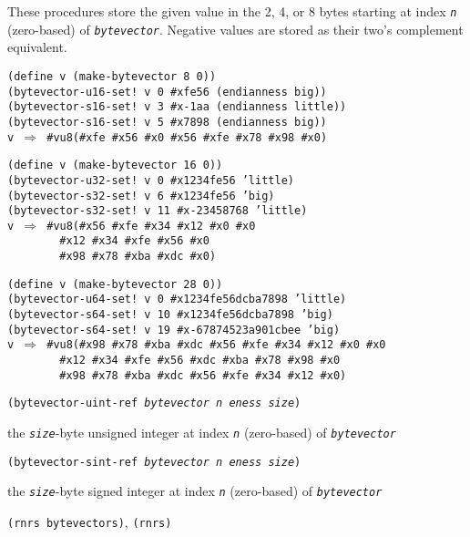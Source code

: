 These procedures store the given value in the 2, 4, or 8 bytes starting
at index \texttt{\textit{n}} (zero-based) of \texttt{\textit{bytevector}}.
Negative values are stored as their two's complement equivalent.


\begin{alltt}
(define v (make-bytevector 8 0))
(bytevector-u16-set! v 0 \#{}xfe56 (endianness big))
(bytevector-s16-set! v 3 \#{}x-1aa (endianness little))
(bytevector-s16-set! v 5 \#{}x7898 (endianness big))
v \(\Rightarrow\) \#{}vu8(\#{}xfe \#{}x56 \#{}x0 \#{}x56 \#{}xfe \#{}x78 \#{}x98 \#{}x0)

(define v (make-bytevector 16 0))
(bytevector-u32-set! v 0 \#{}x1234fe56 'little)
(bytevector-s32-set! v 6 \#{}x1234fe56 'big)
(bytevector-s32-set! v 11 \#{}x-23458768 'little)
v \(\Rightarrow\) \#{}vu8(\#{}x56 \#{}xfe \#{}x34 \#{}x12 \#{}x0 \#{}x0
        \#{}x12 \#{}x34 \#{}xfe \#{}x56 \#{}x0
        \#{}x98 \#{}x78 \#{}xba \#{}xdc \#{}x0)

(define v (make-bytevector 28 0))
(bytevector-u64-set! v 0 \#{}x1234fe56dcba7898 'little)
(bytevector-s64-set! v 10 \#{}x1234fe56dcba7898 'big)
(bytevector-s64-set! v 19 \#{}x-67874523a901cbee 'big)
v \(\Rightarrow\) \#{}vu8(\#{}x98 \#{}x78 \#{}xba \#{}xdc \#{}x56 \#{}xfe \#{}x34 \#{}x12 \#{}x0 \#{}x0
        \#{}x12 \#{}x34 \#{}xfe \#{}x56 \#{}xdc \#{}xba \#{}x78 \#{}x98 \#{}x0
        \#{}x98 \#{}x78 \#{}xba \#{}xdc \#{}x56 \#{}xfe \#{}x34 \#{}x12 \#{}x0)
\end{alltt}

\begin{description}

\label{objects_s258}\item[procedure] \texttt{(bytevector-uint-ref \textit{bytevector} \textit{n} \textit{eness} \textit{size})}



\item[returns] the \texttt{\textit{size}}-byte unsigned integer at index \texttt{\textit{n}} (zero-based) of \texttt{\textit{bytevector}} 


\item[procedure] \texttt{(bytevector-sint-ref \textit{bytevector} \textit{n} \textit{eness} \textit{size})}



\item[returns] the \texttt{\textit{size}}-byte signed integer at index \texttt{\textit{n}} (zero-based) of \texttt{\textit{bytevector}} 


\item[libraries] \texttt{(rnrs bytevectors)}, \texttt{(rnrs)}
\end{description}

